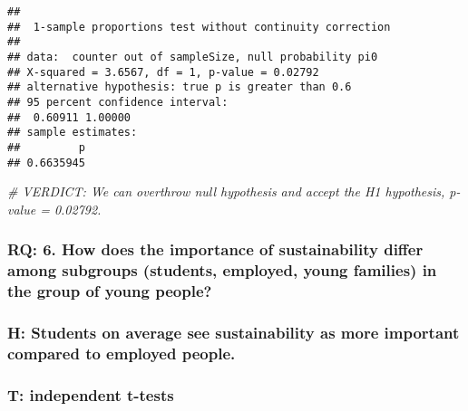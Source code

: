 \documentclass[
]{article}
\newenvironment{Shaded}{\begin{snugshade}}{\end{snugshade}}
\newcommand{\CommentTok}[1]{\textcolor[rgb]{0.56,0.35,0.01}{\textit{#1}}}
\begin{document}
\begin{verbatim}
## 
##  1-sample proportions test without continuity correction
## 
## data:  counter out of sampleSize, null probability pi0
## X-squared = 3.6567, df = 1, p-value = 0.02792
## alternative hypothesis: true p is greater than 0.6
## 95 percent confidence interval:
##  0.60911 1.00000
## sample estimates:
##         p 
## 0.6635945
\end{verbatim}

\begin{Shaded}
\begin{Highlighting}[]
\CommentTok{\# VERDICT: We can overthrow null hypothesis and accept the H1 hypothesis, p{-}value = 0.02792.}
\end{Highlighting}
\end{Shaded}

\hypertarget{rq-6.-how-does-the-importance-of-sustainability-differ-among-subgroups-students-employed-young-families-in-the-group-of-young-people}{%
\subsubsection{RQ: 6. How does the importance of sustainability differ
among subgroups (students, employed, young families) in the group of
young
people?}\label{rq-6.-how-does-the-importance-of-sustainability-differ-among-subgroups-students-employed-young-families-in-the-group-of-young-people}}

\hypertarget{h-students-on-average-see-sustainability-as-more-important-compared-to-employed-people.}{%
\subsubsection{H: Students on average see sustainability as more
important compared to employed
people.}\label{h-students-on-average-see-sustainability-as-more-important-compared-to-employed-people.}}

\hypertarget{t-independent-t-tests}{%
\subsubsection{T: independent t-tests}\label{t-independent-t-tests}}
\end{document}
